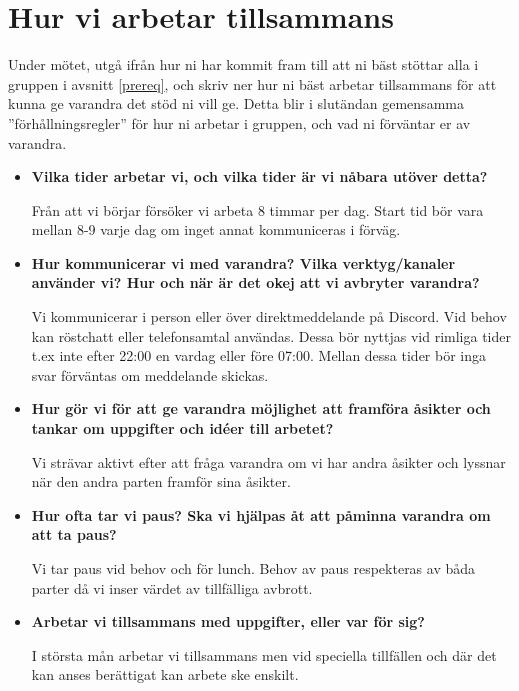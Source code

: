 \documentclass{mall}
\begin{document}
\section{Hur vi arbetar tillsammans}


Under mötet, utgå ifrån hur ni har kommit fram till att ni bäst stöttar alla i gruppen i avsnitt
\ref{prereq}, och skriv ner hur ni bäst arbetar tillsammans för att kunna ge varandra det stöd ni
vill ge. Detta blir i slutändan gemensamma ''förhållningsregler'' för hur ni arbetar i gruppen, och
vad ni förväntar er av varandra.


\begin{itemize}
\item \textbf{Vilka tider arbetar vi, och vilka tider är vi nåbara utöver detta?}

  Från att vi börjar försöker vi arbeta 8 timmar per dag. Start tid bör vara mellan 8-9 varje dag om inget annat kommuniceras i förväg.

\item \textbf{Hur kommunicerar vi med varandra? Vilka verktyg/kanaler använder vi? Hur och när är det okej att vi avbryter varandra?}

  Vi kommunicerar i person eller över direktmeddelande på Discord. Vid behov kan röstchatt eller telefonsamtal användas. Dessa bör nyttjas vid rimliga tider t.ex inte efter 22:00 en vardag eller före 07:00. Mellan dessa tider bör inga svar förväntas om meddelande skickas.

\item \textbf{Hur gör vi för att ge varandra möjlighet att framföra åsikter och tankar om uppgifter och idéer till arbetet?}

  Vi strävar aktivt efter att fråga varandra om vi har andra åsikter och lyssnar när den andra parten framför sina åsikter.

\item \textbf{Hur ofta tar vi paus? Ska vi hjälpas åt att påminna varandra om att ta paus?}

  Vi tar paus vid behov och för lunch. Behov av paus respekteras av båda parter då vi inser värdet av tillfälliga avbrott.

\item \textbf{Arbetar vi tillsammans med uppgifter, eller var för sig?}

  I största mån arbetar vi tillsammans men vid speciella tillfällen och där det kan anses berättigat kan arbete ske enskilt.


\end{itemize}
\end{document}
